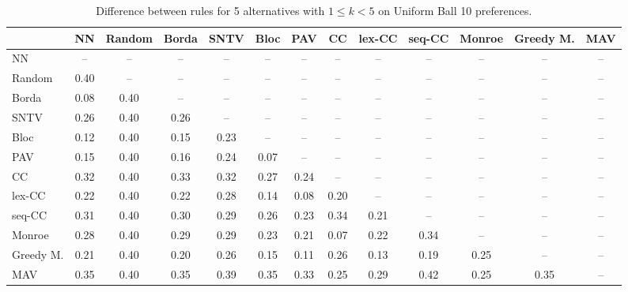 
\begin{table*}[htbp]
\centering
\begin{tabular}{lcccccccccccc}
\toprule
 & NN & Random & Borda & SNTV & Bloc & PAV & CC & lex-CC & seq-CC & Monroe & Greedy M. & MAV \\
\midrule
NN & -- & -- & -- & -- & -- & -- & -- & -- & -- & -- & -- & -- \\
Random & \cellcolor{blue!40} 0.40 & -- & -- & -- & -- & -- & -- & -- & -- & -- & -- & -- \\
Borda & \cellcolor{blue!8} 0.08 & \cellcolor{blue!40} 0.40 & -- & -- & -- & -- & -- & -- & -- & -- & -- & -- \\
SNTV & \cellcolor{blue!26} 0.26 & \cellcolor{blue!40} 0.40 & \cellcolor{blue!26} 0.26 & -- & -- & -- & -- & -- & -- & -- & -- & -- \\
Bloc & \cellcolor{blue!12} 0.12 & \cellcolor{blue!40} 0.40 & \cellcolor{blue!15} 0.15 & \cellcolor{blue!23} 0.23 & -- & -- & -- & -- & -- & -- & -- & -- \\
PAV & \cellcolor{blue!15} 0.15 & \cellcolor{blue!40} 0.40 & \cellcolor{blue!16} 0.16 & \cellcolor{blue!24} 0.24 & \cellcolor{blue!7} 0.07 & -- & -- & -- & -- & -- & -- & -- \\
CC & \cellcolor{blue!32} 0.32 & \cellcolor{blue!40} 0.40 & \cellcolor{blue!33} 0.33 & \cellcolor{blue!32} 0.32 & \cellcolor{blue!27} 0.27 & \cellcolor{blue!24} 0.24 & -- & -- & -- & -- & -- & -- \\
lex-CC & \cellcolor{blue!22} 0.22 & \cellcolor{blue!40} 0.40 & \cellcolor{blue!22} 0.22 & \cellcolor{blue!28} 0.28 & \cellcolor{blue!14} 0.14 & \cellcolor{blue!8} 0.08 & \cellcolor{blue!20} 0.20 & -- & -- & -- & -- & -- \\
seq-CC & \cellcolor{blue!31} 0.31 & \cellcolor{blue!40} 0.40 & \cellcolor{blue!30} 0.30 & \cellcolor{blue!28} 0.29 & \cellcolor{blue!26} 0.26 & \cellcolor{blue!23} 0.23 & \cellcolor{blue!34} 0.34 & \cellcolor{blue!21} 0.21 & -- & -- & -- & -- \\
Monroe & \cellcolor{blue!28} 0.28 & \cellcolor{blue!40} 0.40 & \cellcolor{blue!28} 0.29 & \cellcolor{blue!28} 0.29 & \cellcolor{blue!23} 0.23 & \cellcolor{blue!21} 0.21 & \cellcolor{blue!7} 0.07 & \cellcolor{blue!22} 0.22 & \cellcolor{blue!34} 0.34 & -- & -- & -- \\
Greedy M. & \cellcolor{blue!21} 0.21 & \cellcolor{blue!40} 0.40 & \cellcolor{blue!20} 0.20 & \cellcolor{blue!26} 0.26 & \cellcolor{blue!15} 0.15 & \cellcolor{blue!11} 0.11 & \cellcolor{blue!26} 0.26 & \cellcolor{blue!13} 0.13 & \cellcolor{blue!19} 0.19 & \cellcolor{blue!25} 0.25 & -- & -- \\
MAV & \cellcolor{blue!35} 0.35 & \cellcolor{blue!40} 0.40 & \cellcolor{blue!35} 0.35 & \cellcolor{blue!39} 0.39 & \cellcolor{blue!35} 0.35 & \cellcolor{blue!33} 0.33 & \cellcolor{blue!25} 0.25 & \cellcolor{blue!28} 0.29 & \cellcolor{blue!42} 0.42 & \cellcolor{blue!25} 0.25 & \cellcolor{blue!35} 0.35 & -- \\
\bottomrule
\end{tabular}

\caption{Difference between rules for 5 alternatives with $1 \leq k < 5$ on Uniform Ball 10 preferences.}
\label{tab:rule_distance_heatmap-m=[5]-pref_dist=euclidean__args__dimensions=10_-_space=uniform_ball}
\end{table*}
    